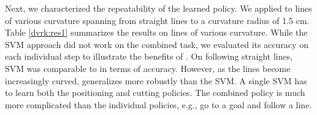Next, we characterized the repeatability of the learned policy.
We applied \hirl to lines of various curvature spanning from straight lines to a curvature radius of 1.5 cm.
Table \ref{dvrk:res1} summarizes the results on lines of various curvature.
While the SVM approach did not work on the combined task, we evaluated its accuracy on each individual step to illustrate the benefits of \hirl.
On following straight lines, SVM was comparable to \hirl in terms of accuracy.
However, as the lines become increasingly curved, \hirl generalizes more robustly than the SVM.
A single SVM has to learn both the positioning and cutting policies. The combined policy is much more complicated than the individual policies, e.g., go to a  goal and follow a line.






